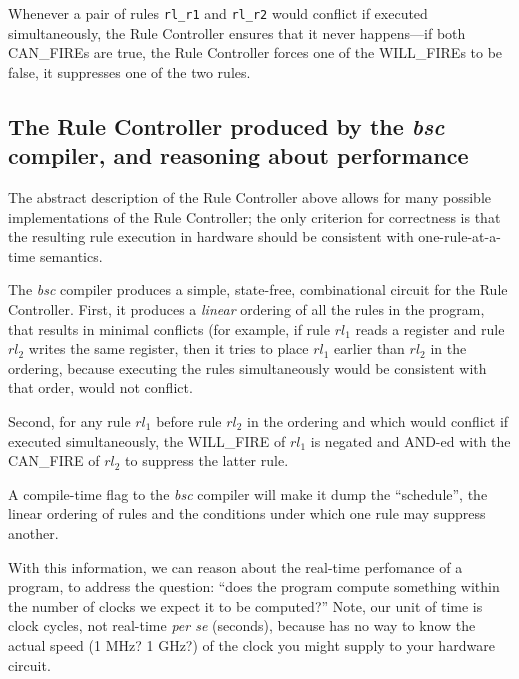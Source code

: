 Whenever a pair of rules \verb|rl_r1| and \verb|rl_r2| would conflict
if executed simultaneously, the Rule Controller ensures that it never
happens---if both CAN\_FIREs are true, the Rule Controller forces one
of the WILL\_FIREs to be false, {\ie} it suppresses one of the two
rules.


\subsection{The Rule Controller produced by the \emph{bsc} compiler,
and reasoning about performance}

The abstract description of the Rule Controller above allows for many
possible implementations of the Rule Controller; the only criterion
for correctness is that the resulting rule execution in hardware
should be consistent with one-rule-at-a-time semantics.

The \emph{bsc} compiler produces a simple, state-free, combinational
circuit for the Rule Controller.  First, it produces a \emph{linear}
ordering of all the rules in the program, that results in minimal
conflicts (for example, if rule $rl_1$ reads a register and rule
$rl_2$ writes the same register, then it tries to place $rl_1$ earlier
than $rl_2$ in the ordering, because executing the rules
simultaneously would be consistent with that order, {\ie} would not
conflict.

Second, for any rule $rl_1$ before rule $rl_2$ in the ordering and
which would conflict if executed simultaneously, the WILL\_FIRE of
$rl_1$ is negated and AND-ed with the CAN\_FIRE of $rl_2$ to suppress
the latter rule.

A compile-time flag to the \emph{bsc} compiler will make it dump the
``schedule'', {\ie} the linear ordering of rules and the conditions
under which one rule may suppress another.

With this information, we can reason about the real-time perfomance of
a {\BSV} program, {\ie} to address the question: ``does the program
compute something within the number of clocks we expect it to be
computed?''  Note, our unit of time is clock cycles, not real-time
\emph{per se} (seconds), because {\BSV} has no way to know the actual
speed (1 MHz?  1 GHz?) of the clock you might supply to your hardware
circuit.


